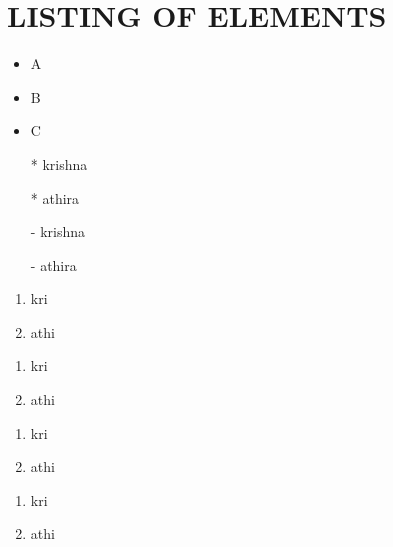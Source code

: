 \documentclass[12pt]{report}
\begin{document}
\section{LISTING OF ELEMENTS}
\begin{itemize}
	\item A
	\item B
	\item C
\end{itemize}
\begin{itemize}
	\item[*]krishna
	\item[*]athira
\end{itemize}
\begin{itemize}
	\item[-]krishna
	\item[-]athira
\end{itemize}
\begin{enumerate}[label=\Roman*]
	\item kri
	\item athi
\end{enumerate}
\begin{enumerate}[label=\roman*]
	\item kri
	\item athi
\end{enumerate}
\begin{enumerate}[label=\alph*]
	\item kri
	\item athi
\end{enumerate}
\begin{enumerate}[label=\Alph*]
	\item kri
	\item athi
\end{enumerate}
\end{document}
